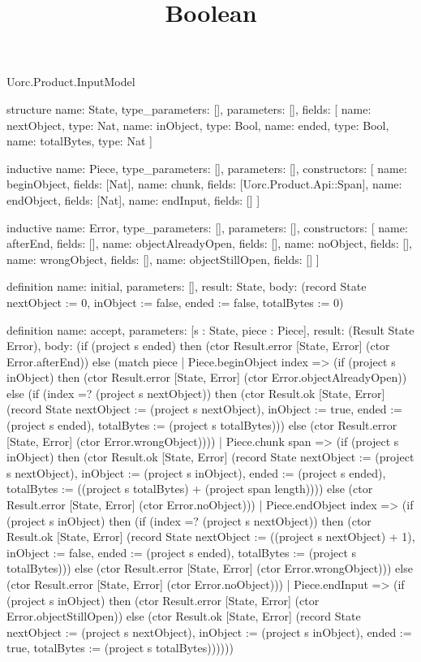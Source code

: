 \begin{lexlean}{Uorc.Product.InputModel}
\title{Boolean}
\begin{semanticmodule}
structure{
  name: State,
  type_parameters: [],
  parameters: [],
  fields: [
    {name: nextObject, type: Nat},
    {name: inObject, type: Bool},
    {name: ended, type: Bool},
    {name: totalBytes, type: Nat}
  ]
}

inductive{
  name: Piece,
  type_parameters: [],
  parameters: [],
  constructors: [
    {name: beginObject, fields: [Nat]},
    {name: chunk, fields: [Uorc.Product.Api::Span]},
    {name: endObject, fields: [Nat]},
    {name: endInput, fields: []}
  ]
}

inductive{
  name: Error,
  type_parameters: [],
  parameters: [],
  constructors: [
    {name: afterEnd, fields: []},
    {name: objectAlreadyOpen, fields: []},
    {name: noObject, fields: []},
    {name: wrongObject, fields: []},
    {name: objectStillOpen, fields: []}
  ]
}

definition{
  name: initial,
  parameters: [],
  result: State,
  body: (record State {nextObject := 0, inObject := false, ended := false, totalBytes := 0})
}

definition{
  name: accept,
  parameters: [s : State, piece : Piece],
  result: (Result State Error),
  body: (if (project s ended) then (ctor Result.error [State, Error] (ctor Error.afterEnd)) else (match piece
    | Piece.beginObject index => (if (project s inObject) then (ctor Result.error [State, Error] (ctor Error.objectAlreadyOpen)) else (if (index =? (project s nextObject)) then (ctor Result.ok [State, Error] (record State {nextObject := (project s nextObject), inObject := true, ended := (project s ended), totalBytes := (project s totalBytes)})) else (ctor Result.error [State, Error] (ctor Error.wrongObject))))
    | Piece.chunk span => (if (project s inObject) then (ctor Result.ok [State, Error] (record State {nextObject := (project s nextObject), inObject := (project s inObject), ended := (project s ended), totalBytes := ((project s totalBytes) + (project span length))})) else (ctor Result.error [State, Error] (ctor Error.noObject)))
    | Piece.endObject index => (if (project s inObject) then (if (index =? (project s nextObject)) then (ctor Result.ok [State, Error] (record State {nextObject := ((project s nextObject) + 1), inObject := false, ended := (project s ended), totalBytes := (project s totalBytes)})) else (ctor Result.error [State, Error] (ctor Error.wrongObject))) else (ctor Result.error [State, Error] (ctor Error.noObject)))
    | Piece.endInput => (if (project s inObject) then (ctor Result.error [State, Error] (ctor Error.objectStillOpen)) else (ctor Result.ok [State, Error] (record State {nextObject := (project s nextObject), inObject := (project s inObject), ended := true, totalBytes := (project s totalBytes)})))))
}


\end{semanticmodule}
\end{lexlean}
